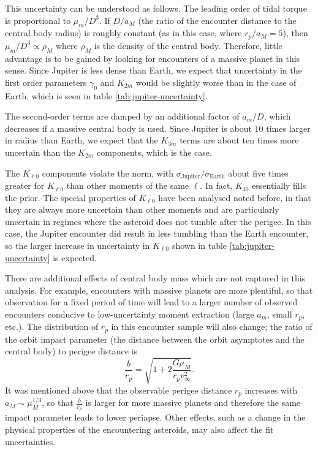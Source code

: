 \documentclass[fleqn,usenatbib]{mnras}
\begin{document}
This uncertainty can be understood as follows. The leading order of tidal torque is proportional to $\mu_m / D^3$. If $D/a_M$ (the ratio of the encounter distance to the central body radius) is roughly constant (as in this case, where $r_p/a_M=5$), then $\mu_m / D^3 \propto \rho_M$ where $\rho_M$ is the density of the central body. Therefore, little advantage is to be gained by looking for encounters of a massive planet in this sense. Since Jupiter is less dense than Earth, we expect that uncertainty in the first order parameters $\gamma_0$ and $K_{2m}$ would be slightly worse than in the case of Earth, which is seen in table \ref{tab:jupiter-uncertainty}.

The second-order terms are damped by an additional factor of $a_m/D$, which decreases if a massive central body is used. Since Jupiter is about 10 times larger in radius than Earth, we expect that the $K_{3m}$ terms are about ten times more uncertain than the $K_{2m}$ components, which is the case.

The $K_{\ell 0}$ components violate the norm, with $\sigma_\text{Jupiter}/\sigma_\text{Earth}$ about five times greater for $K_{\ell 0}$ than other moments of the same $\ell$. In fact, $K_{30}$ essentially fills the prior. The special properties of $K_{\ell 0}$ have been analysed noted before, in that they are always more uncertain than other moments and are particularly uncertain in regimes where the asteroid does not tumble after the perigee. In this case, the Jupiter encounter did result in less tumbling than the Earth encounter, so the larger increase in uncertainty in $K_{\ell 0}$ shown in table \ref{tab:jupiter-uncertainty} is expected.

There are additional effects of central body mass which are not captured in this analysis. For example, encounters with massive planets are more plentiful, so that observation for a fixed period of time will lead to a larger number of observed encounters conducive to low-uncertainty moment extraction (large $a_m$, small $r_p$, etc.). The distribution of $r_p$ in this encounter sample will also change; the ratio of the orbit impact parameter (the distance between the orbit asymptotes and the central body) to perigee distance is 
\begin{equation}
  \frac{b}{r_p} = \sqrt{1+2\frac{G\mu_M}{r_p v_\infty^2}}.
\end{equation}
It was mentioned above that the observable perigee distance $r_p$ increases with $a_M \sim \mu_M^{1/3}$, so that $\frac{b}{r_p}$ is larger for more massive planets and therefore the same impact parameter leads to lower periapse. Other effects, such as a change in the physical properties of the encountering asteroids, may also affect the fit uncertainties.
\end{document}
